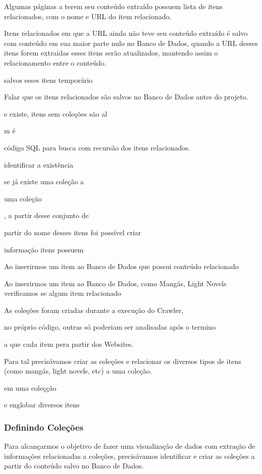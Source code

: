 \documentclass[12pt]{article}
\begin{document}
Algumas páginas a terem seu conteúdo extraído possuem lista de itens relacionados, com o nome e URL do item relacionado.

Itens relacionados em que a URL ainda não teve seu conteúdo extraído é salvo com conteúdo em sua maior parte nulo no Banco de Dados, quando a URL desses itens forem extraídas esses itens serão atualizados, mantendo assim o relacionamento entre o conteúdo.


salvos esses itens temporário


Falar que os itens relacionados são salvos no Banco de Dados antes do projeto.
 


e existe, itens sem coleções são al

m é 

código SQL para busca com recursão dos itens relacionados.


identificar a existência 

se já existe uma coleção a 

uma coleção 


, a partir desse conjunto de 

 partir do nome desses itens foi possível criar 

informação  itens possuem 

Ao inserirmos um item ao Banco de Dados que possui conteúdo relacionado 

Ao inserirmos um item ao Banco de Dados, como Mangás, Light Novels verificamos se algum item relacionado

As coleções foram criadas durante a execução do Crawler, 

 no próprio código, outras só poderiam ser analisadas após o termino 

 a que cada item pera partir dos Websites.


Para tal precisávamos criar as coleções e relacionar os diversos tipos de itens (como mangás, light novels, etc) a uma coleção.



em uma coleçção


e englobar diversos itens






\subsubsection{Definindo Coleções}

Para alcançarmos o objetivo de fazer uma visualização de dados com extração de informações relacionadas a coleções, precisávamos identificar e criar as coleções a partir do conteúdo salvo no Banco de Dados.
\end{document}
